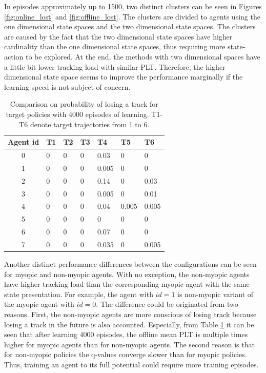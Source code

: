\documentclass[english, 12pt, a4paper, elec, utf8, a-1b, online]{aaltothesis}
\begin{document}
In episodes approximately up to 1500, two distinct clusters can be seen in Figures \ref{fig:online_lost} and \ref{fig:offline_lost}.
The clusters are divided to agents using the one dimensional state spaces and the two dimensional state spaces.
The clusters are caused by the fact that the two dimensional state spaces have higher cardinality than the one dimensional state spaces, thus requiring more state-action to be explored.
At the end, the methods with two dimensional spaces have a little bit lower tracking load with similar PLT.
Therefore, the higher dimensional state space seems to improve the performance marginally if the learning speed is not subject of concern.

\begin{table}[tb]
    \centering
    \begin{tabular}{|c|l|l|l|l|l|l|}
        \hline
        \textbf{Agent id} & \textbf{T1} & \textbf{T2} & \textbf{T3} & \textbf{T4} & \textbf{T5} & \textbf{T6} \\ \hline
        0 & 0 & 0 & 0 & 0.03  & 0     & 0     \\ \hline
        1 & 0 & 0 & 0 & 0.005 & 0     & 0     \\ \hline
        2 & 0 & 0 & 0 & 0.14  & 0     & 0.03  \\ \hline
        3 & 0 & 0 & 0 & 0.005 & 0     & 0.01  \\ \hline
        4 & 0 & 0 & 0 & 0.04  & 0.005 & 0.005 \\ \hline
        5 & 0 & 0 & 0 & 0     & 0     & 0     \\ \hline
        6 & 0 & 0 & 0 & 0.07  & 0     & 0     \\ \hline
        7 & 0 & 0 & 0 & 0.035 & 0     & 0.005 \\ \hline
    \end{tabular}
    \caption{Comparison on probability of losing a track for target policies with 4000 episodes of learning. T1-T6 denote target trajectories from 1 to 6.}
    \label{tab:plt_comparison}
\end{table}

Another distinct performance differences between the configurations can be seen for myopic and non-myopic agents.
With no exception, the non-myopic agents have higher tracking load than the corresponding myopic agent with the same state presentation. 
For example, the agent with $id=1$ is non-myopic variant of the myopic agent with $id=0$.
The difference could be originated from two reasons.
First, the non-myopic agents are more conscious of losing track because losing a track in the future is also accounted.
Especially, from Table \ref{tab:plt_comparison} it can be seen that after learning 4000 episodes, the offline mean PLT is multiple times higher for myopic agents than for non-myopic agents.
The second reason is that for non-myopic policies the q-values converge slower than for myopic policies. Thus, training an agent to its full potential could require more training episodes.
\end{document}
